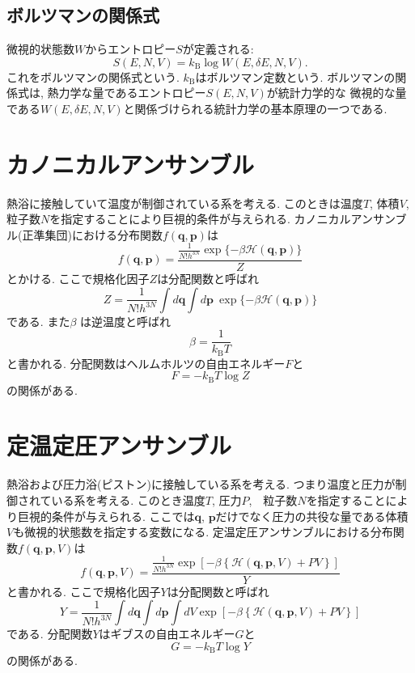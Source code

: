 \subsection{ボルツマンの関係式}
微視的状態数$W$からエントロピー$S$が定義される:
\begin{equation}
 S(E, N, V) = k_{\mathrm{B}} \log W(E, \delta E, N, V).
\end{equation}
これをボルツマンの関係式という.
$k_{\mathrm{B}}$はボルツマン定数という.
ボルツマンの関係式は, 熱力学な量であるエントロピー$S(E, N, V)$が統計力学的な
微視的な量である$W(E, \delta E, N, V)$と関係づけられる統計力学の基本原理の一つである.

\section{カノニカルアンサンブル}
熱浴に接触していて温度が制御されている系を考える.
このときは温度$T$, 体積$V$, 粒子数$N$を指定することにより巨視的条件が与えられる.
カノニカルアンサンブル(正準集団)における分布関数$f(\bm{q}, \bm{p})$は
\begin{equation}
 f(\bm{q}, \bm{p})
=\frac{\frac{1}{N! h^{3N}}\exp\{-\beta \mathcal{H}(\bm{q}, \bm{p})\} }{Z}
\end{equation}
とかける. ここで規格化因子$Z$は分配関数と呼ばれ
\begin{equation}
 Z = \frac{1}{N! h^{3N}} \int d\bm{q} \int d\bm{p} ~ \exp\{-\beta \mathcal{H}(\bm{q}, \bm{p})\}
\end{equation}
である. また$\beta$ は逆温度と呼ばれ
\begin{equation}
 \beta = \frac{1}{k_{\mathrm{B}} T}
\end{equation}
と書かれる. 分配関数はヘルムホルツの自由エネルギー$F$と
\begin{equation}
 F = - k_{\mathrm{B}} T \log Z
\end{equation}
の関係がある.

\section{定温定圧アンサンブル}
熱浴および圧力浴(ピストン)に接触している系を考える.
つまり温度と圧力が制御されている系を考える.
このとき温度$T$, 圧力$P$,　粒子数$N$を指定することにより巨視的条件が与えられる.
ここでは$\bm{q}$, $\bm{p}$だけでなく圧力の共役な量である体積$V$も微視的状態数を指定する変数になる.
定温定圧アンサンブルにおける分布関数$f(\bm{q}, \bm{p}, V)$は
\begin{equation}
 f(\bm{q}, \bm{p}, V)
=\frac{\frac{1}{N! h^{3N}}
       \exp \left[-\beta \left\{ \mathcal{H}(\bm{q}, \bm{p}, V) + PV \right\} \right]}{Y}
\end{equation}
と書かれる. ここで規格化因子$Y$は分配関数と呼ばれ
\begin{equation}
 Y
=\frac{1}{N! h^{3N}} \int d\bm{q} \int d\bm{p} \int dV
 \exp \left[-\beta \left\{ \mathcal{H}(\bm{q}, \bm{p}, V) + PV \right\} \right]
\end{equation}
である. 分配関数$Y$はギブスの自由エネルギー$G$と
\begin{equation}
 G = -k_{\mathrm{B}} T \log Y
\end{equation}
の関係がある.


